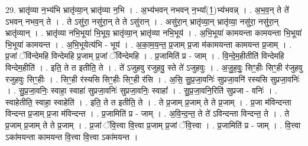 \documentclass[17pt]{extarticle}
\begin{document}
29. भ्रातृ॑व्या न॒भ्य॑भि भ्रातृ॑व्या॒न् भ्रातृ॑व्या न॒भि । . अ॒भ्य॑भवन् नभवन् न॒भ्या᳚(1॒)भ्य॑भवन्न् । . अ॒भ॒व॒न् ते ते॑ ऽभवन् नभव॒न् ते । . ते ऽसु॑रा॒ नसु॑रा॒न् ते ते ऽसु॑रान् । . असु॑रा॒न् भ्रातृ॑व्या॒न् भ्रातृ॑व्या॒ नसु॑रा॒ नसु॑रा॒न् भ्रातृ॑व्यान् । . भ्रातृ॑व्या नभि॒भूया॑ भि॒भूय॒ भ्रातृ॑व्या॒न् भ्रातृ॑व्या नभि॒भूय॑ । . अ॒भि॒भूया॑ कामयन्ता कामयन्ता भि॒भूया॑ भि॒भूया॑ कामयन्त । . अ॒भि॒भूयेत्य॑भि - भूय॑ । . अ॒का॒म॒य॒न्त॒ प्र॒जाम् प्र॒जा म॑कामयन्ता कामयन्त प्र॒जाम् । . प्र॒जां ॅवि॑न्देमहि विन्देमहि प्र॒जाम् प्र॒जां ॅवि॑न्देमहि । . प्र॒जामिति॑ प्र - जाम् । . वि॒न्दे॒म॒हीतीति॑ विन्देमहि विन्देम॒हीति॑ । . इति॒ ते त इतीति॒ ते । . ते॑ ऽजुहवु रजुहवु॒ स्ते ते॑ ऽजुहवुः । . अ॒जु॒ह॒वुः॒ सिꣳ॒॒हीः सिꣳ॒॒ही र॑जुहवु रजुहवुः सिꣳ॒॒हीः । . सिꣳ॒॒ही र॑स्यसि सिꣳ॒॒हीः सिꣳ॒॒ही र॑सि । . अ॒सि॒ सु॒प्र॒जा॒वनिः॑ सुप्रजा॒वनि॑ रस्यसि सुप्रजा॒वनिः॑ । . सु॒प्र॒जा॒वनिः॒ स्वाहा॒ स्वाहा॑ सुप्रजा॒वनिः॑ सुप्रजा॒वनिः॒ स्वाहा᳚ । . सु॒प्र॒जा॒वनि॒रिति॑ सुप्रजा - वनिः॑ । . स्वाहेतीति॒ स्वाहा॒ स्वाहेति॑ । . इति॒ ते त इतीति॒ ते । . ते प्र॒जाम् प्र॒जाम् ते ते प्र॒जाम् । . प्र॒जा म॑विन्दन्ता विन्दन्त प्र॒जाम् प्र॒जा म॑विन्दन्त । . प्र॒जामिति॑ प्र - जाम् । . अ॒वि॒न्द॒न्त॒ ते ते॑ ऽविन्दन्ता विन्दन्त॒ ते । . ते प्र॒जाम् प्र॒जाम् ते ते प्र॒जाम् । . प्र॒जां ॅवि॒त्त्वा वि॒त्त्वा प्र॒जाम् प्र॒जां ॅवि॒त्त्वा । . प्र॒जामिति॑ प्र - जाम् । . वि॒त्त्वा ऽका॑मयन्ता कामयन्त वि॒त्त्वा वि॒त्त्वा ऽका॑मयन्त । \newline
\end{document}
